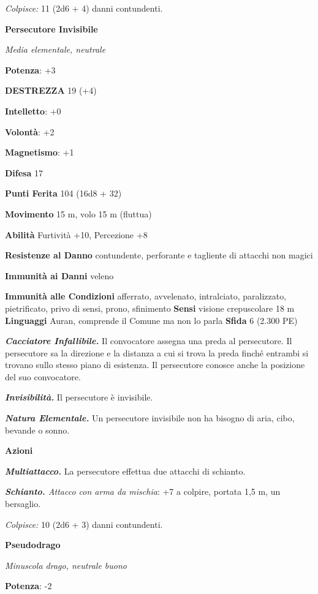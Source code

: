 \begin{multicols}{2}
\emph{Colpisce:} 11 (2d6 + 4) danni contundenti.

\textbf{Persecutore Invisibile}

\emph{Media elementale, neutrale}

\textbf{Potenza}: +3

\textbf{DESTREZZA} 19 (+4)



\textbf{Intelletto}: +0

\textbf{Volontà}: +2

\textbf{Magnetismo}: +1

\textbf{Difesa} 17

\textbf{Punti Ferita} 104 (16d8 + 32)

\textbf{Movimento} 15 m, volo 15 m (fluttua)

\textbf{Abilità} Furtività +10, Percezione +8

\textbf{Resistenze al Danno} contundente, perforante e tagliente di
attacchi non magici

\textbf{Immunità ai Danni} veleno

\textbf{Immunità alle Condizioni} afferrato, avvelenato, intralciato,
paralizzato, pietrificato, privo di sensi, prono, sfinimento
\textbf{Sensi} visione crepuscolare 18 m
\textbf{Linguaggi} Auran, comprende il Comune ma non lo parla
\textbf{Sfida} 6 (2.300 PE)

\emph{\textbf{Cacciatore Infallibile.}} Il convocatore assegna una preda
al persecutore. Il persecutore sa la direzione e la distanza a cui si
trova la preda finché entrambi si trovano sullo stesso piano di
esistenza. Il persecutore conosce anche la posizione del suo
convocatore.

\emph{\textbf{Invisibilità.}} Il persecutore è invisibile.

\emph{\textbf{Natura Elementale.}} Un persecutore invisibile non ha
bisogno di aria, cibo, bevande o sonno.

\textbf{Azioni}

\emph{\textbf{Multiattacco.}} La persecutore effettua due attacchi di
schianto.

\emph{\textbf{Schianto.} Attacco con arma da mischia}: +7 a colpire,
portata 1,5 m, un bersaglio.

\emph{Colpisce:} 10 (2d6 + 3) danni contundenti.

\textbf{Pseudodrago}

\emph{Minuscola drago, neutrale buono}

\textbf{Potenza}: -2


\end{multicols}
